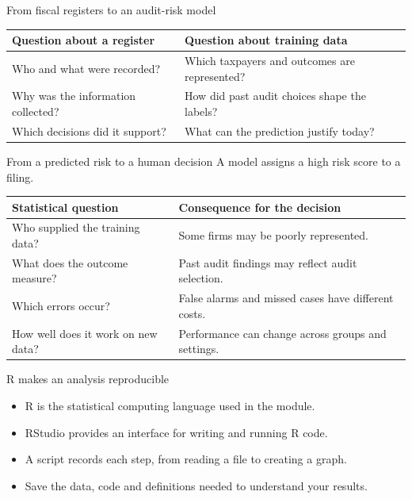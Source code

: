 \begin{frame}{From fiscal registers to an audit-risk model}
\begin{tabular}{>{\raggedright\arraybackslash}p{}>{\raggedright\arraybackslash}p{}}\toprule
\textbf{Question about a register} & \textbf{Question about training data}\\\midrule
Who and what were recorded? & Which taxpayers and outcomes are represented?\\[3mm]
Why was the information collected? & How did past audit choices shape the labels?\\[3mm]
Which decisions did it support? & What can the prediction justify today?\\\bottomrule
\end{tabular}\par
{}
\end{frame}


\begin{frame}{From a predicted risk to a human decision}
A model assigns a high risk score to a filing.
\par\vspace{3mm}
\begin{tabular}{>{\raggedright\arraybackslash}p{}>{\raggedright\arraybackslash}p{}}\toprule
\textbf{Statistical question} & \textbf{Consequence for the decision}\\\midrule
Who supplied the training data? & Some firms may be poorly represented.\\[2mm]
What does the outcome measure? & Past audit findings may reflect audit selection.\\[2mm]
Which errors occur? & False alarms and missed cases have different costs.\\[2mm]
How well does it work on new data? & Performance can change across groups and settings.\\\bottomrule
\end{tabular}\par
\end{frame}

\begin{frame}{R makes an analysis reproducible}
\begin{itemize}
\item R is the statistical computing language used in the module.
\item RStudio provides an interface for writing and running R code.
\item A script records each step, from reading a file to creating a graph.
\item Save the data, code and definitions needed to understand your results.
\end{itemize}
\end{frame}

